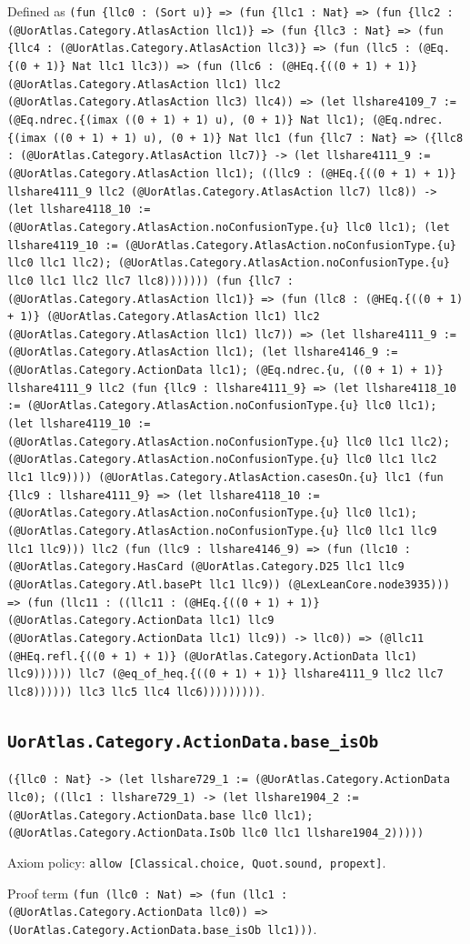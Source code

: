\documentclass[11pt]{article}
\begin{document}
\noindent Defined as \texttt{(fun \{llc0 : (Sort u)\} => (fun \{llc1 : Nat\} => (fun \{llc2 : (@UorAtlas.Category.AtlasAction llc1)\} => (fun \{llc3 : Nat\} => (fun \{llc4 : (@UorAtlas.Category.AtlasAction llc3)\} => (fun (llc5 : (@Eq.\{(0 + 1)\} Nat llc1 llc3)) => (fun (llc6 : (@HEq.\{((0 + 1) + 1)\} (@UorAtlas.Category.AtlasAction llc1) llc2 (@UorAtlas.Category.AtlasAction llc3) llc4)) => (let llshare4109\_7 := (@Eq.ndrec.\{(imax ((0 + 1) + 1) u), (0 + 1)\} Nat llc1); (@Eq.ndrec.\{(imax ((0 + 1) + 1) u), (0 + 1)\} Nat llc1 (fun \{llc7 : Nat\} => (\{llc8 : (@UorAtlas.Category.AtlasAction llc7)\} -> (let llshare4111\_9 := (@UorAtlas.Category.AtlasAction llc1); ((llc9 : (@HEq.\{((0 + 1) + 1)\} llshare4111\_9 llc2 (@UorAtlas.Category.AtlasAction llc7) llc8)) -> (let llshare4118\_10 := (@UorAtlas.Category.AtlasAction.noConfusionType.\{u\} llc0 llc1); (let llshare4119\_10 := (@UorAtlas.Category.AtlasAction.noConfusionType.\{u\} llc0 llc1 llc2); (@UorAtlas.Category.AtlasAction.noConfusionType.\{u\} llc0 llc1 llc2 llc7 llc8))))))) (fun \{llc7 : (@UorAtlas.Category.AtlasAction llc1)\} => (fun (llc8 : (@HEq.\{((0 + 1) + 1)\} (@UorAtlas.Category.AtlasAction llc1) llc2 (@UorAtlas.Category.AtlasAction llc1) llc7)) => (let llshare4111\_9 := (@UorAtlas.Category.AtlasAction llc1); (let llshare4146\_9 := (@UorAtlas.Category.ActionData llc1); (@Eq.ndrec.\{u, ((0 + 1) + 1)\} llshare4111\_9 llc2 (fun \{llc9 : llshare4111\_9\} => (let llshare4118\_10 := (@UorAtlas.Category.AtlasAction.noConfusionType.\{u\} llc0 llc1); (let llshare4119\_10 := (@UorAtlas.Category.AtlasAction.noConfusionType.\{u\} llc0 llc1 llc2); (@UorAtlas.Category.AtlasAction.noConfusionType.\{u\} llc0 llc1 llc2 llc1 llc9)))) (@UorAtlas.Category.AtlasAction.casesOn.\{u\} llc1 (fun \{llc9 : llshare4111\_9\} => (let llshare4118\_10 := (@UorAtlas.Category.AtlasAction.noConfusionType.\{u\} llc0 llc1); (@UorAtlas.Category.AtlasAction.noConfusionType.\{u\} llc0 llc1 llc9 llc1 llc9))) llc2 (fun (llc9 : llshare4146\_9) => (fun (llc10 : (@UorAtlas.Category.HasCard (@UorAtlas.Category.D25 llc1 llc9 (@UorAtlas.Category.Atl.basePt llc1 llc9)) (@LexLeanCore.node3935))) => (fun (llc11 : ((llc11 : (@HEq.\{((0 + 1) + 1)\} (@UorAtlas.Category.ActionData llc1) llc9 (@UorAtlas.Category.ActionData llc1) llc9)) -> llc0)) => (@llc11 (@HEq.refl.\{((0 + 1) + 1)\} (@UorAtlas.Category.ActionData llc1) llc9)))))) llc7 (@eq\_of\_heq.\{((0 + 1) + 1)\} llshare4111\_9 llc2 llc7 llc8)))))) llc3 llc5 llc4 llc6)))))))))}.\par
\subsection*{\texttt{UorAtlas.Category.ActionData.base\_isOb}}
\noindent\texttt{(\{llc0 : Nat\} -> (let llshare729\_1 := (@UorAtlas.Category.ActionData llc0); ((llc1 : llshare729\_1) -> (let llshare1904\_2 := (@UorAtlas.Category.ActionData.base llc0 llc1); (@UorAtlas.Category.ActionData.IsOb llc0 llc1 llshare1904\_2)))))}\par
\noindent Axiom policy: \texttt{allow [Classical.choice, Quot.sound, propext]}.\par
\noindent Proof term \texttt{(fun (llc0 : Nat) => (fun (llc1 : (@UorAtlas.Category.ActionData llc0)) => (UorAtlas.Category.ActionData.base\_isOb llc1)))}.\par
\end{document}
